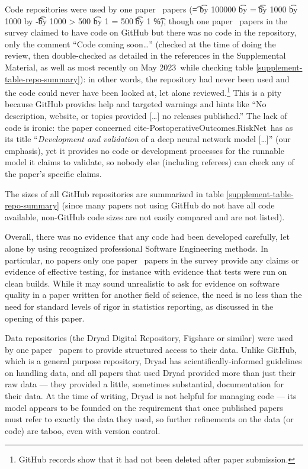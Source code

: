 \documentclass[10pt,a4paper]{article}
\def\supplement{Supplemental Material}
\def\pc#1#2{\t = #1%
\multiply \t by 100000%
\divide \t by #2%
\tu = \t
\divide \t by 1000%
\multiply \t by 1000%
\advance \tu by -\t%
\divide \t by 1000\relax%
\ifnum \tu > 500 %
	\advance \t by 1 
\else
	\ifnum \tu = 500 
		\ifodd \t %
			\advance \t by 1
		\else %
		\fi
	\fi
\fi
\the\t\%}
\def\plural#1#2{\ifnum #1=1 
	one #2%
\else
	\the#1\ #2s%
\fi}
\def\clonedate {\ignorespaces 25 May 2023}
\begin{document}
Code repositories were used by \plural{\countUsesVersionControlRepository}{paper} (\pc{\countUsesVersionControlRepository}{\dataN}), though \plural{\countNoCodeInRepo}{paper} in the survey claimed to have code on GitHub but there was no code in the repository, only the comment ``Code coming soon\ldots'' (checked at the time of doing the review, then double-checked as detailed in the references in the \supplement, as well as most recently on \clonedate\
while checking table \ref{supplement-table-repo-summary}): in other words, the repository had never been used and the code could never have been looked at, let alone reviewed.\footnote{GitHub records show that it had not been deleted after paper submission.} This is a pity because GitHub provides help and targeted warnings and hints like ``No description, website, or topics provided [\ldots] no releases published.'' The lack of code is ironic: the paper concerned \csname cite-PostoperativeOutcomes.RiskNet\endcsname\ has as its title ``\emph{Development and validation\/} of a deep neural network model [\ldots]'' (our emphasis), yet it provides no code or development processes for the runnable model it claims to validate, so nobody else (including referees) can check any of the paper's specific claims.

The sizes of all GitHub repositories are summarized in table \ref{supplement-table-repo-summary} (since many papers not using GitHub do not have all code available, non-GitHub code sizes are not easily compared and are not listed). 

Overall, there was no evidence that any code had been developed carefully, let alone by using recognized professional Software Engineering methods. In particular, 
\ifnum \countCodetested=0
no papers
\else only \plural{\countCodetested}{paper}
\fi in the survey provide any claims or evidence of effective testing, for instance with evidence that tests were run on clean builds. {While it may sound unrealistic to ask for evidence on software quality in a paper written for another field of science, the need is no less than the need for standard levels of rigor in statistics reporting, as discussed in the opening of this paper.}

Data repositories (the Dryad Digital Repository, Figshare or similar) were used by \plural{\counthasDataRepository}{paper} to provide structured access to their data. Unlike GitHub, which is a general purpose repository, Dryad has scientifically-informed guidelines on handling data, and all papers that used Dryad provided more than just their raw data --- they provided a little, sometimes substantial, documentation for their data. At the time of writing, Dryad is not helpful for managing code --- its model appears to be founded on the requirement that once published papers must refer to exactly the data they used, so further refinements on the data (or code) are taboo, even with version control.
\end{document}
